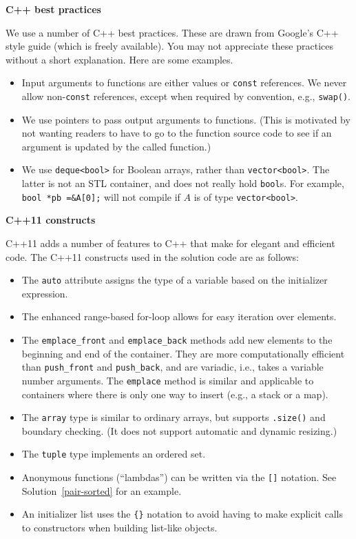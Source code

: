 \documentclass[10pt,openany,twoside,letterpaper,extrafontsizes]{memoir}
\begin{document}
\begin{Spacing}{\gettingReadySpacing}
\noindent\textbf{C++ best practices}
\label{c++bestpractices}

We use a number of C++ best practices. These are drawn from Google's C++ style guide (which is freely available).
You may not appreciate these practices without a short explanation. Here are some examples.
\begin{itemize}
\item Input arguments to functions are either values or \texttt{const} references.
We never allow non-\texttt{const} references, except when required
by convention, e.g., \texttt{swap()}.
\item We use pointers to pass output arguments to functions.
(This is motivated by not wanting readers to have to go to the function
source code to see if an argument is updated by the called function.)
\item We use \texttt{deque<bool>} for Boolean arrays, rather than \texttt{vector<bool>}.
The latter is not an STL container, and does not really hold \texttt{bool}s. For
example, \texttt{bool *pb =\&A[0];} will not compile if $A$ is of type \texttt{vector<bool>}.
\end{itemize}


\noindent\textbf{C++11 constructs}
\label{c++11summary}
\nopagebreak[4]

C++11 adds a number of features to C++ that make for elegant
and efficient code. The C++11 constructs used in the solution
code are as follows:
\begin{itemize}
\item The \texttt{auto} attribute assigns the
type of a variable based on the initializer expression.
\item The enhanced range-based for-loop allows
for easy iteration over elements.
\item The \texttt{emplace\_front} and \texttt{emplace\_back}
methods add new elements to the beginning and end of the container.
They are more computationally efficient than \texttt{push\_front} and
\texttt{push\_back}, and are variadic, i.e., takes a variable number arguments. The \texttt{emplace} method is similar and applicable to
containers where there is only one way to insert (e.g., a stack or a map).
\item The \texttt{array} type is similar to ordinary arrays,
but supports \texttt{.size()} and boundary checking.
(It does not support automatic and dynamic resizing.)
\item The \texttt{tuple} type implements an ordered set.
\item Anonymous functions (``lambdas'') can be written
via the \texttt{[]} notation.
See Solution~\vref{pair-sorted} for an example.
\item An initializer list uses the \texttt{\{\}} notation
to avoid having to make explicit calls to constructors when building list-like
objects.
\end{itemize}


\end{Spacing}
\end{document}
